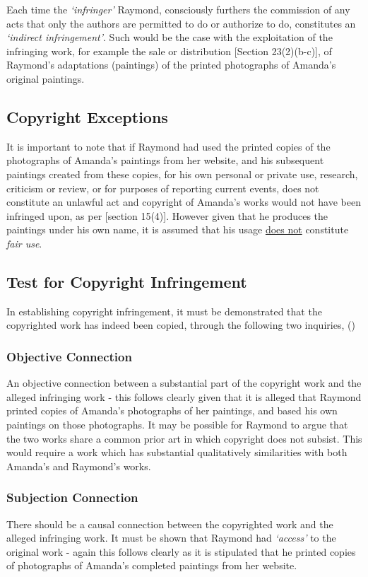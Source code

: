 \documentclass[11pt]{article}
\begin{document}
Each time the \emph{`infringer'} Raymond, consciously furthers the commission of any
acts that only the authors are permitted to do or authorize to do, constitutes
an \emph{`indirect infringement'}. Such would be the case with the exploitation of
the infringing work, for example the sale or distribution [Section
23(2)(b-c)]\cite{rsa78_copyrightact}, of Raymond's adaptations (paintings) of the
printed photographs of Amanda's original paintings.

\subsection{Copyright Exceptions}
\label{sec:org0c5cb4f}
It is important to note that if Raymond had used the printed copies of the
photographs of Amanda's paintings from her website, and his subsequent paintings
created from these copies, for his own personal or private use, research,
criticism or review, or for purposes of reporting current events, does not
constitute an unlawful act and copyright of Amanda's works would not have been
infringed upon, as per [section 15(4)]\cite{rsa78_copyrightact}. However given
that he produces the paintings under his own name, it is assumed that his usage
\uline{does not} constitute \emph{fair use}.\\

\subsection{Test for Copyright Infringement}
\label{sec:org3bb75b2}
In establishing copyright infringement, it must be demonstrated that the
copyrighted work has indeed been copied, through the following two inquiries,
() \cite{corbett89_galago_v_erasmus}
\subsubsection{Objective Connection}
\label{sec:orge0ac4d7}
An objective connection between a substantial part of the copyright work and the
alleged infringing work - this follows clearly given that it is alleged that
Raymond printed copies of Amanda's photographs of her paintings, and based his
own paintings on those photographs. It may be possible for Raymond to argue that
the two works share a common prior art in which copyright does not subsist. This
would require a work which has substantial qualitatively similarities with both
Amanda's and Raymond's works.
\subsubsection{Subjection Connection}
\label{sec:org47ae1d2}
There should be a causal connection between the copyrighted work and the alleged
infringing work. It must be shown that Raymond had \emph{`access'} to the original
work - again this follows clearly as it is stipulated that he printed copies of
photographs of Amanda's completed paintings from her website.
\end{document}
